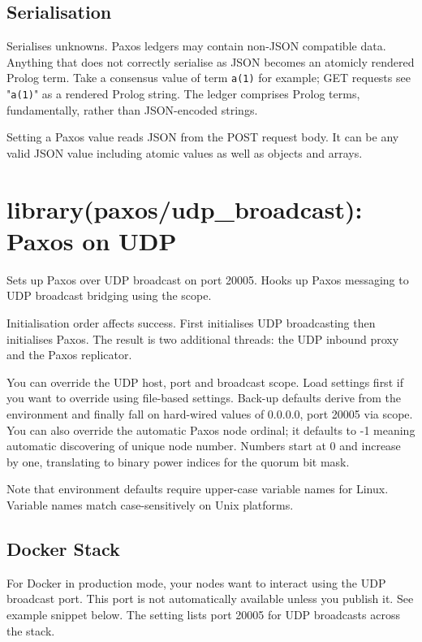 \section{Serialisation}

Serialises unknowns. Paxos ledgers may contain non-JSON compatible data.
Anything that does not correctly serialise as JSON becomes an atomicly
rendered Prolog term. Take a consensus value of term \verb$a(1)$ for example;
GET requests see "\verb$a(1)$" as a rendered Prolog string. The ledger
comprises Prolog terms, fundamentally, rather than JSON-encoded strings.

Setting a Paxos value reads JSON from the POST request body. It can be
any valid JSON value including atomic values as well as objects and
arrays.\vspace{0.7cm}\chapter{library(paxos/udp_broadcast): Paxos on UDP}\label{sec:udpbroadcast}

Sets up Paxos over UDP broadcast on port 20005. Hooks up Paxos messaging
to UDP broadcast bridging using the  scope.

Initialisation order affects success. First initialises UDP
broadcasting then initialises Paxos. The result is two additional
threads: the UDP inbound proxy and the Paxos replicator.

You can override the UDP host, port and broadcast scope. Load settings
first if you want to override using file-based settings. Back-up
defaults derive from the environment and finally fall on hard-wired
values of 0.0.0.0, port 20005 via  scope. You can also override
the automatic Paxos node ordinal; it defaults to -1 meaning automatic
discovering of unique node number. Numbers start at 0 and increase by
one, translating to binary power indices for the quorum bit mask.

Note that environment defaults require upper-case variable names for
Linux. Variable names match case-sensitively on Unix platforms.

\section{Docker Stack}

For Docker in production mode, your nodes want to interact using the UDP
broadcast port. This port is not automatically available unless you
publish it. See example snippet below. The  setting lists port
20005 for UDP broadcasts across the stack.

